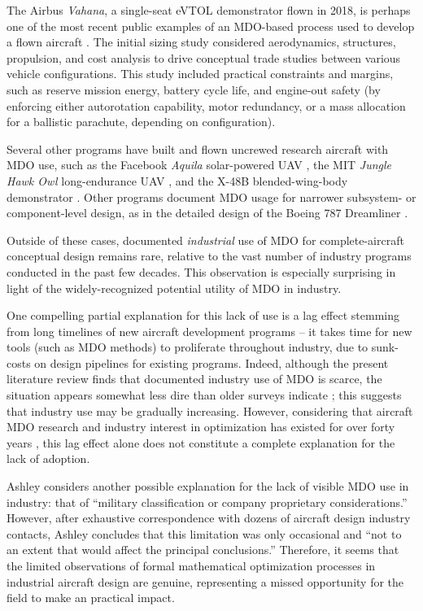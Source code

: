 \documentclass[12pt,vi,oneside]{report}
\begin{document}
    The Airbus \textit{Vahana}, a single-seat eVTOL demonstrator flown in 2018, is perhaps one of the most recent public examples of an MDO-based process used to develop a flown aircraft \cite{vahana_1, vahana_2, vahana_code}. The initial sizing study considered aerodynamics, structures, propulsion, and cost analysis to drive conceptual trade studies between various vehicle configurations. This study included practical constraints and margins, such as reserve mission energy, battery cycle life, and engine-out safety (by enforcing either autorotation capability, motor redundancy, or a mass allocation for a ballistic parachute, depending on configuration).

    Several other programs have built and flown uncrewed research aircraft with MDO use, such as the Facebook \textit{Aquila} solar-powered UAV \cite{fbhale}, the MIT \textit{Jungle Hawk Owl} long-endurance UAV \cite{jho}, and the X-48B blended-wing-body demonstrator \cite{wakayama_2000_blended, liebeck_blendedwingbody_1998, liebeck2004design}. Other programs document MDO usage for narrower subsystem- or component-level design, as in the detailed design of the Boeing 787 Dreamliner \cite{agte_mdo_2010}.

    Outside of these cases, documented \textit{industrial} use of MDO for complete-aircraft conceptual design remains rare, relative to the vast number of industry programs conducted in the past few decades. This observation is especially surprising in light of the widely-recognized potential utility of MDO in industry.

    One compelling partial explanation for this lack of use is a lag effect stemming from long timelines of new aircraft development programs -- it takes time for new tools (such as MDO methods) to proliferate throughout industry, due to sunk-costs on design pipelines for existing programs. Indeed, although the present literature review finds that documented industry use of MDO is scarce, the situation appears somewhat less dire than older surveys indicate \cite{kroo_multidisciplinary_1997, agte_mdo_2010, ashley_making_1982, haftka_multidisciplinary_1997, gazaix_industrialization_2017}; this suggests that industry use may be gradually increasing. However, considering that aircraft MDO research and industry interest in optimization has existed for over forty years \cite{vanderplaats_automated_1976, ashley_making_1982}, this lag effect alone does not constitute a complete explanation for the lack of adoption.

    Ashley considers another possible explanation for the lack of visible MDO use in industry: that of ``military classification or company proprietary considerations.'' \cite{ashley_making_1982} However, after exhaustive correspondence with dozens of aircraft design industry contacts, Ashley concludes that this limitation was only occasional and ``not to an extent that would affect the principal conclusions.'' Therefore, it seems that the limited observations of formal mathematical optimization processes in industrial aircraft design are genuine, representing a missed opportunity for the field to make an practical impact.
\end{document}
